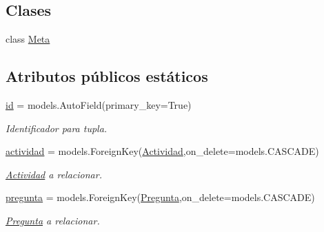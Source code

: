 \subsection*{Clases}
\begin{DoxyCompactItemize}
\item 
class \hyperlink{classappEmotionIOT_1_1models_1_1Actividad__Pregunta_1_1Meta}{Meta}
\end{DoxyCompactItemize}
\subsection*{Atributos públicos estáticos}
\begin{DoxyCompactItemize}
\item 
\hyperlink{classappEmotionIOT_1_1models_1_1Actividad__Pregunta_a56db42c42dff6753e8a631a5c3997b56}{id} = models.\+Auto\+Field(primary\+\_\+key=True)\hypertarget{classappEmotionIOT_1_1models_1_1Actividad__Pregunta_a56db42c42dff6753e8a631a5c3997b56}{}\label{classappEmotionIOT_1_1models_1_1Actividad__Pregunta_a56db42c42dff6753e8a631a5c3997b56}

\begin{DoxyCompactList}\small\item\em Identificador para tupla. \end{DoxyCompactList}\item 
\hyperlink{classappEmotionIOT_1_1models_1_1Actividad__Pregunta_a8264968b3f49304a5673e2dc2f367016}{actividad} = models.\+Foreign\+Key(\hyperlink{classappEmotionIOT_1_1models_1_1Actividad}{Actividad},on\+\_\+delete=models.\+C\+A\+S\+C\+A\+DE)\hypertarget{classappEmotionIOT_1_1models_1_1Actividad__Pregunta_a8264968b3f49304a5673e2dc2f367016}{}\label{classappEmotionIOT_1_1models_1_1Actividad__Pregunta_a8264968b3f49304a5673e2dc2f367016}

\begin{DoxyCompactList}\small\item\em \hyperlink{classappEmotionIOT_1_1models_1_1Actividad}{Actividad} a relacionar. \end{DoxyCompactList}\item 
\hyperlink{classappEmotionIOT_1_1models_1_1Actividad__Pregunta_a9c096d3ec18da1448fee7ee44f0a96be}{pregunta} = models.\+Foreign\+Key(\hyperlink{classappEmotionIOT_1_1models_1_1Pregunta}{Pregunta},on\+\_\+delete=models.\+C\+A\+S\+C\+A\+DE)\hypertarget{classappEmotionIOT_1_1models_1_1Actividad__Pregunta_a9c096d3ec18da1448fee7ee44f0a96be}{}\label{classappEmotionIOT_1_1models_1_1Actividad__Pregunta_a9c096d3ec18da1448fee7ee44f0a96be}

\begin{DoxyCompactList}\small\item\em \hyperlink{classappEmotionIOT_1_1models_1_1Pregunta}{Pregunta} a relacionar. \end{DoxyCompactList}\end{DoxyCompactItemize}


